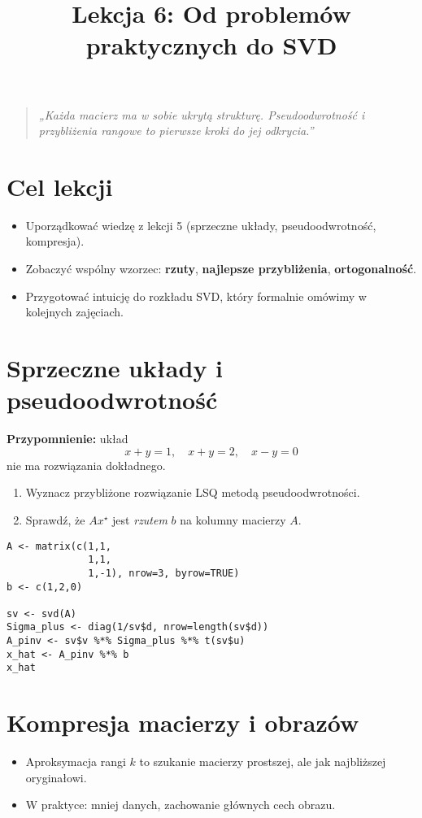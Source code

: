 \documentclass[12pt]{article}
\title{Lekcja 6: Od problemów praktycznych do SVD}
\author{}
\date{}
\begin{document}
\maketitle

\begin{quote}
\emph{„Każda macierz ma w sobie ukrytą strukturę. Pseudoodwrotność i przybliżenia rangowe
to pierwsze kroki do jej odkrycia.”}
\end{quote}

\section*{Cel lekcji}
\begin{itemize}
  \item Uporządkować wiedzę z lekcji 5 (sprzeczne układy, pseudoodwrotność, kompresja).
  \item Zobaczyć wspólny wzorzec: \textbf{rzuty}, \textbf{najlepsze przybliżenia}, \textbf{ortogonalność}.
  \item Przygotować intuicję do rozkładu SVD, który formalnie omówimy w kolejnych zajęciach.
\end{itemize}

\section{Sprzeczne układy i pseudoodwrotność}
\textbf{Przypomnienie:} układ
\[
x+y=1,\quad x+y=2,\quad x-y=0
\]
nie ma rozwiązania dokładnego.

\begin{enumerate}[label=\textbf{Z\arabic*}.]
  \item Wyznacz przybliżone rozwiązanie LSQ metodą pseudoodwrotności.
  \item Sprawdź, że $Ax^\star$ jest \emph{rzutem} $b$ na kolumny macierzy $A$.
\end{enumerate}

\begin{lstlisting}
A <- matrix(c(1,1,
              1,1,
              1,-1), nrow=3, byrow=TRUE)
b <- c(1,2,0)

sv <- svd(A)
Sigma_plus <- diag(1/sv$d, nrow=length(sv$d))
A_pinv <- sv$v %*% Sigma_plus %*% t(sv$u)
x_hat <- A_pinv %*% b
x_hat
\end{lstlisting}

\section{Kompresja macierzy i obrazów}
\begin{itemize}
  \item Aproksymacja rangi $k$ to szukanie macierzy prostszej, ale jak najbliższej oryginałowi.
  \item W praktyce: mniej danych, zachowanie głównych cech obrazu.
\end{itemize}
\end{document}
